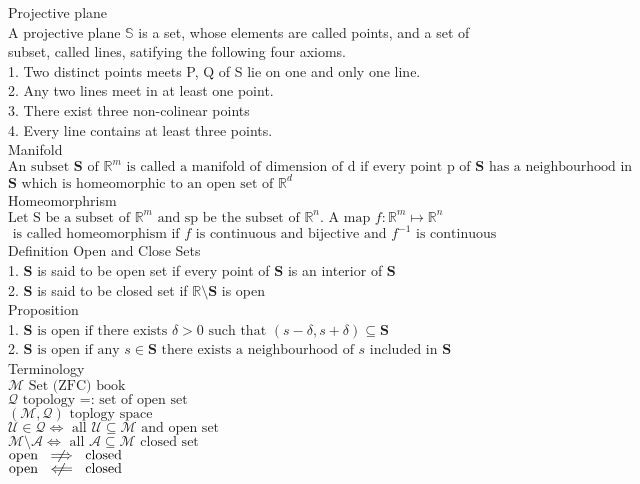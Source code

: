 \documentclass[10pt]{article}
\begin{document}
\noindent
Projective plane\\
A projective plane $\mathbb{S}$ is a set, whose elements are called points, and a set of subset, called lines, satifying the following four axioms.\\
1. Two distinct points meets P, Q of S lie on one and only one line.\\ 
2. Any two lines meet in at least one point.\\
3. There exist three non-colinear points\\
4. Every line contains at least three points.\\

\noindent
Manifold\\
$\text{An subset }\mathbf{S} \text{ of } \mathbb{R}^{m} \text{ is called a manifold of dimension of d if every point p of }\mathbf{S} \text{ has a neighbourhood in }$
$\mathbf{S}\text{ which is homeomorphic to an open set of }\mathbb{R}^{d}$\\

\noindent
Homeomorphrism\\
$\text{Let S be a subset of }\mathbb{R}^{m} \text{ and sp be the subset of }\mathbb{R}^{n}. \text{ A map } \mathit{f}: \mathbb{R}^{m} \mapsto \mathbb{R}^{n}$\\
$\text{ is called homeomorphism if }\mathit{f} \text{ is continuous and bijective and }\mathit{f}^{-1} \text{ is continuous}$\\


\noindent
Definition Open and Close Sets\\
1. $\mathbf{S}$ is said to be open set if every point of $\mathbf{S}$ is an interior of $\mathbf{S}$\\
2. $\mathbf{S}$ is said to be closed set if $\mathbb{R}\setminus\mathbf{S}$ is open\\  

\noindent
Proposition\\
1. $\mathbf{S} \text{ is open if there exists } \delta > 0 \text{ such that } (\mathit{s} - \delta, \mathit{s} + \delta) \subseteq \mathbf{S}$\\
2. $\mathbf{S} \text{ is open if any }\mathit{s} \in \mathbf{S} \text{ there exists a neighbourhood of }\mathit{s} \text{ included in }\mathbf{S}$\\  


\noindent
Terminology\\
$\mathcal{M} \text{ Set (ZFC) book}$\\
$\mathcal{Q} \text{ topology =: set of open set}$\\
$(\mathcal{M}, \mathcal{Q}) \text{ toplogy space}$\\
$\mathcal{U} \in \mathcal{Q} \iff \text{ all } \mathcal{U} \subseteq \mathcal{M} \text{ and open set}$\\
$\mathcal{M} \setminus \mathcal{A} \iff   \text{ all }    \mathcal{A} \subseteq \mathcal{M} \text{ closed set}$\\
$\text{open } \centernot\implies \text{ closed}$\\
$\text{open } \centernot\impliedby \text{ closed}$\\
\end{document}
